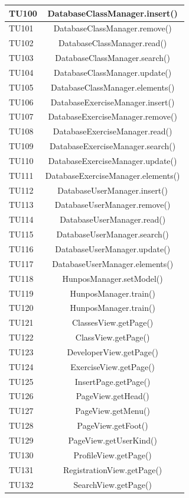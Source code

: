 \begin{longtable}{|>{\centering\arraybackslash}m{1.6cm}|c|}
		TU100 & DatabaseClassManager.insert()  \\ \hline
		TU101 & DatabaseClassManager.remove()  \\ \hline
		TU102 & DatabaseClassManager.read()  \\ \hline
		TU103 & DatabaseClassManager.search()  \\ \hline
		TU104 & DatabaseClassManager.update()  \\ \hline
		TU105 & DatabaseClassManager.elements()  \\ \hline
		TU106 & DatabaseExerciseManager.insert()  \\ \hline
		TU107 & DatabaseExerciseManager.remove()  \\ \hline
		TU108 & DatabaseExerciseManager.read()  \\ \hline
		TU109 & DatabaseExerciseManager.search()  \\ \hline
		TU110 & DatabaseExerciseManager.update()  \\ \hline
		TU111 & DatabaseExerciseManager.elements()  \\ \hline
		TU112 & DatabaseUserManager.insert()  \\ \hline
		TU113 & DatabaseUserManager.remove()  \\ \hline
		TU114 & DatabaseUserManager.read()  \\ \hline
		TU115 & DatabaseUserManager.search()  \\ \hline
		TU116 & DatabaseUserManager.update()  \\ \hline
		TU117 & DatabaseUserManager.elements()  \\ \hline

		TU118 & HunposManager.setModel()  \\ \hline
		TU119 & HunposManager.train()  \\ \hline
		TU120 & HunposManager.train()  \\ \hline
		
		TU121 & ClassesView.getPage()\\ \hline
		TU122 & ClassView.getPage()\\ \hline
		TU123 & DeveloperView.getPage()\\ \hline
		TU124 & ExerciseView.getPage()\\ \hline
		TU125 & InsertPage.getPage()\\ \hline
		TU126 & PageView.getHead()\\ \hline
		TU127 & PageView.getMenu() \\ \hline
		TU128 & PageView.getFoot()\\ \hline
		TU129 & PageView.getUserKind()\\ \hline
		TU130 & ProfileView.getPage()\\ \hline
		TU131 & RegistrationView.getPage()\\ \hline
		TU132 & SearchView.getPage()\\ \hline
		

\end{longtable}
